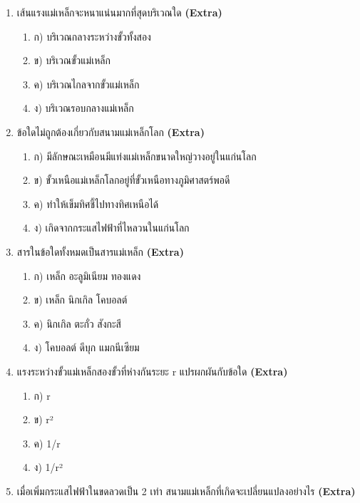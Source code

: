\documentclass[12pt]{article}
\begin{document}
\begin{enumerate}[label=\arabic*.]
\begin{enumerate}[label=)]
\item ข) ขั้วเดียวกันจะผลักกัน
\item ค) ขั้วต่างกันจะดึงดูดกัน
\item ง) สามารถแยกขั้วแม่เหล็กออกจากกันได้โดยการตัด
\end{enumerate}
\item เส้นแรงแม่เหล็กจะหนาแน่นมากที่สุดบริเวณใด \hfill \textbf{\small (Extra)}
\begin{enumerate}[label=)]
\item ก) บริเวณกลางระหว่างขั้วทั้งสอง
\item ข) บริเวณขั้วแม่เหล็ก
\item ค) บริเวณไกลจากขั้วแม่เหล็ก
\item ง) บริเวณรอบกลางแม่เหล็ก
\end{enumerate}
\item ข้อใดไม่ถูกต้องเกี่ยวกับสนามแม่เหล็กโลก \hfill \textbf{\small (Extra)}
\begin{enumerate}[label=)]
\item ก) มีลักษณะเหมือนมีแท่งแม่เหล็กขนาดใหญ่วางอยู่ในแก่นโลก
\item ข) ขั้วเหนือแม่เหล็กโลกอยู่ที่ขั้วเหนือทางภูมิศาสตร์พอดี
\item ค) ทำให้เข็มทิศชี้ไปทางทิศเหนือได้
\item ง) เกิดจากกระแสไฟฟ้าที่ไหลวนในแก่นโลก
\end{enumerate}
\item สารในข้อใดทั้งหมดเป็นสารแม่เหล็ก \hfill \textbf{\small (Extra)}
\begin{enumerate}[label=)]
\item ก) เหล็ก อะลูมิเนียม ทองแดง
\item ข) เหล็ก นิกเกิล โคบอลต์
\item ค) นิกเกิล ตะกั่ว สังกะสี
\item ง) โคบอลต์ ดีบุก แมกนีเซียม
\end{enumerate}
\item แรงระหว่างขั้วแม่เหล็กสองขั้วที่ห่างกันระยะ r แปรผกผันกับข้อใด \hfill \textbf{\small (Extra)}
\begin{enumerate}[label=)]
\item ก) r
\item ข) r²
\item ค) 1/r
\item ง) 1/r²
\end{enumerate}
\item เมื่อเพิ่มกระแสไฟฟ้าในขดลวดเป็น 2 เท่า สนามแม่เหล็กที่เกิดจะเปลี่ยนแปลงอย่างไร \hfill \textbf{\small (Extra)}
\begin{enumerate}[label=)]

\end{enumerate}
\end{enumerate}
\end{document}

